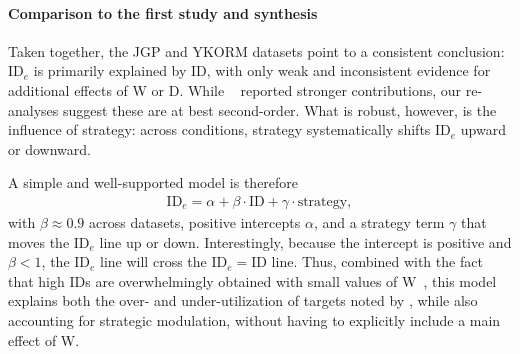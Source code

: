 \documentclass[acmlarge, manuscript,review]{acmart}
\newcommand{\ide}{\ensuremath{{\text{ID}_e}}\xspace}
\begin{document}
\paragraph{Comparison to the first study and synthesis}
Taken together, the JGP and YKORM datasets point to a consistent conclusion: \ide is primarily explained by ID, with only weak and inconsistent evidence for additional effects of W or D. While \citeauthor{zhai2004nominal}~\cite{zhai2004nominal} reported stronger contributions, our re-analyses suggest these are at best second-order. What is robust, however, is the influence of strategy: across conditions, strategy systematically shifts \ide upward or downward.

A simple and well-supported model is therefore
\begin{align}
  \ide = \alpha + \beta\cdot{}\text{ID} + \gamma\cdot{}\text{strategy}, \label{eq:model_ide_simple}
\end{align}
with $\beta \approx 0.9$ across datasets, positive intercepts $\alpha$, and a strategy term $\gamma$ that moves the \ide line up or down.
Interestingly, because the intercept is positive and $\beta < 1$, the \ide line will cross the $\ide = \text{ID}$ line. Thus, combined with the fact that high IDs are overwhelmingly obtained with small values of W~\cite{gori2018chi,guiard2009}, this model explains both the over- and under-utilization of targets noted by \citeauthor{zhai2004nominal}, while also accounting for strategic modulation, without having to explicitly include a main effect of W.

\end{document}
